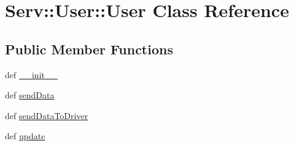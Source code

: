 \hypertarget{class_serv_1_1_user_1_1_user}{
\section{Serv::User::User Class Reference}
\label{class_serv_1_1_user_1_1_user}
}
\subsection*{Public Member Functions}
\begin{CompactItemize}
\item 
def \hyperlink{class_serv_1_1_user_1_1_user_e503b7d48b7eb7c8a399f2652a3ff002}{\_\-\_\-init\_\-\_\-}
\item 
def \hyperlink{class_serv_1_1_user_1_1_user_2d0441db55283b641079acb8bf67c30a}{sendData}
\item 
def \hyperlink{class_serv_1_1_user_1_1_user_0907f262b618e5b6c05c6e3584e24b44}{sendDataToDriver}
\item 
def \hyperlink{class_serv_1_1_user_1_1_user_90697aec786a688ec3308b3ebdcc83a3}{update}
\end{CompactItemize}
